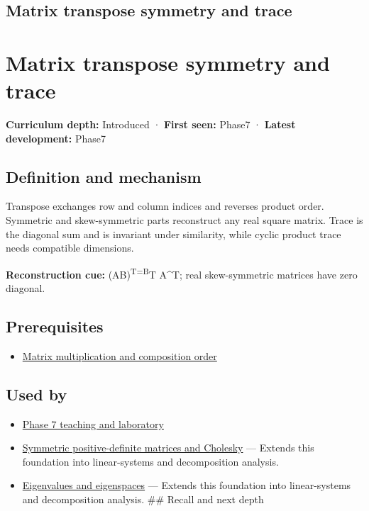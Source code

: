 \hypertarget{appendix-175ca5ff874d}{}
\section*{Matrix transpose symmetry and trace}
\chapter{Matrix transpose symmetry and trace}\label{appendix-175ca5ff874d-matrix-transpose-symmetry-and-trace}

\textbf{Curriculum depth:} Introduced · \textbf{First seen:} Phase7 · \textbf{Latest development:} Phase7

\section{Definition and mechanism}\label{appendix-175ca5ff874d-definition-and-mechanism}

Transpose exchanges row and column indices and reverses product order. Symmetric and skew-symmetric parts reconstruct any real square matrix. Trace is the diagonal sum and is invariant under similarity, while cyclic product trace needs compatible dimensions.

\textbf{Reconstruction cue:} (AB)\textsuperscript{T=B}T A\^{}T; real skew-symmetric matrices have zero diagonal.

\section{Prerequisites}\label{appendix-175ca5ff874d-prerequisites}

\begin{itemize}
\tightlist
\item
  \hyperref[appendix-ab31ef447dbf]{Matrix multiplication and composition order}
\end{itemize}

\section{Used by}\label{appendix-175ca5ff874d-used-by}

\begin{itemize}
\tightlist
\item
  \href{Continuous\%20Notes/Computing\%20Foundations\%20-\%20From\%20Bits\%20to\%20C++\%20and\%20Systems\%20APIs\#Keep\%20the\%20promises\%20visible\%20while\%20moving\%20between\%20representations}{Phase 7 teaching and laboratory}
\item
  \hyperref[appendix-50d2ea3c9b26]{Symmetric positive-definite matrices and Cholesky} --- Extends this foundation into linear-systems and decomposition analysis.
\item
  \hyperref[appendix-0b3be18411f9]{Eigenvalues and eigenspaces} --- Extends this foundation into linear-systems and decomposition analysis. \#\# Recall and next depth
\end{itemize}

